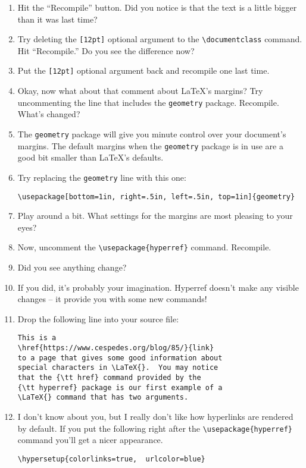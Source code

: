 \begin{enumerate}
	\item Hit the ``Recompile'' button.  Did you notice is that the text is a little bigger than it was last time?
	\item Try deleting the \verb+[12pt]+ optional argument to the \verb+\documentclass+ command.  Hit ``Recompile.'' Do you see the difference now?  
	\item Put the \verb+[12pt]+ optional argument back and recompile one last time.
	\item Okay, now what about that comment about \LaTeX{}'s margins?  Try uncommenting the line that includes the {\tt geometry} package.
	Recompile.  What's changed?
	\item The {\tt geometry} package will give you minute control over your document's margins.  The default margins when the {\tt geometry} package is in use are a good bit smaller than \LaTeX{}'s defaults.
	\item Try replacing the {\tt geometry} line with this one:
\medskip

\begin{codeblock}
\begin{verbatim}
\usepackage[bottom=1in, right=.5in, left=.5in, top=1in]{geometry}
\end{verbatim}
\end{codeblock}
\medskip

    \item Play around a bit.  What settings for the margins are most pleasing to your eyes?
    \item Now, uncomment the \verb+\usepackage{hyperref}+ command.  Recompile.
    \item Did you see anything change?
    \item If you did, it's probably your imagination. Hyperref doesn't make any visible changes -- it provide you with some new commands!
    \item Drop the following line into your source file:
\medskip

\begin{codeblock}
\begin{verbatim}
This is a 
\href{https://www.cespedes.org/blog/85/}{link} 
to a page that gives some good information about 
special characters in \LaTeX{}.  You may notice 
that the {\tt href} command provided by the 
{\tt hyperref} package is our first example of a 
\LaTeX{} command that has two arguments.
\end{verbatim}
\end{codeblock}
\medskip

	\item I don't know about you, but I really don't like how hyperlinks are rendered by default.  If you put the following right after the \verb+\usepackage{hyperref}+ command you'll get a nicer appearance.
\medskip

\begin{codeblock}
\begin{verbatim}
\hypersetup{colorlinks=true,  urlcolor=blue}
\end{verbatim}
\end{codeblock}
\medskip


\end{enumerate}
